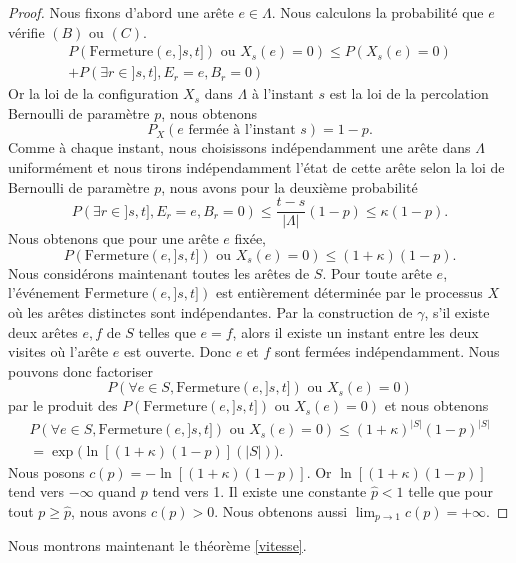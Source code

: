 \documentclass[titlepage,a4paper,12pt]{article}
\newcounter{th}
\begin{document}
\begin{proof}
Nous fixons d'abord une arête $e\in \Lambda$. Nous calculons la probabilité que $e$ vérifie $(B)$ ou $(C)$.
\begin{multline*}P\left( \mathrm{Fermeture}(e,]s,t])\text{ ou }X_s(e) = 0 \right)\leqslant P(X_s(e) = 0)\\+P(\exists r \in ]s,t], E_r = e, B_r = 0)
\end{multline*}
Or la loi de la configuration $X_s$ dans $\Lambda$ à l'instant $s$ est la loi de la percolation Bernoulli de paramètre $p$, nous obtenons $$P_X(e \text{ fermée à l'instant } s) = 1-p.$$
Comme à chaque instant, nous choisissons indépendamment une arête dans $\Lambda$ uniformément et nous tirons indépendamment l'état de cette arête selon la loi de Bernoulli de paramètre $p$, nous avons pour la deuxième probabilité
$$ P(\exists r \in ]s,t], E_r = e, B_r = 0) \leqslant \frac{t-s}{|\Lambda|}(1-p)\leqslant \kappa(1-p).
$$
Nous obtenons que pour une arête $e$ fixée, $$P\left( \mathrm{Fermeture}(e,]s,t])\text{ ou }X_s(e) = 0 \right)\leqslant (1+\kappa)(1-p).$$
Nous considérons maintenant toutes les arêtes de $S$. Pour toute arête $e$, l'événement $\mathrm{Fermeture}(e,]s,t])$ est entièrement déterminée par le processus $X$ où les arêtes distinctes sont indépendantes. Par la construction de $\gamma$, s'il existe deux arêtes $e,f$ de $S$ telles que $e = f$, alors il existe un instant entre les deux visites où l'arête $e$ est ouverte. Donc $e$ et $f$ sont fermées indépendamment. Nous pouvons donc factoriser $$P(\forall e\in S, \mathrm{Fermeture}(e,]s,t])\text{ ou } X_s(e) =0)$$ par le produit des $P(\mathrm{Fermeture}(e,]s,t])\text{ ou } X_s(e) =0)$ et nous obtenons 
\begin{multline*}P\left(\forall e\in S, \mathrm{Fermeture}(e,]s,t])\text{ ou }X_s(e) = 0\right)\leqslant (1+\kappa)^{|S|}(1-p)^{|S|}\\ = \exp\big(\ln[(1+\kappa)(1-p)](|S|)\big).
\end{multline*}
Nous posons $c(p) = -\ln[(1+\kappa)(1-p)]$. Or $\ln[(1+\kappa)(1-p)]$ tend vers $-\infty$ quand $p$ tend vers 1. Il existe une constante $\hat{p}<1$ telle que pour tout $p\geqslant \hat{p}$, nous avons $c(p)>0$. Nous obtenons aussi 
$ \lim_{p\rightarrow 1}c(p) = +\infty
$.
\end{proof}
Nous montrons maintenant le théorème \ref{vitesse}. 
\end{document}
